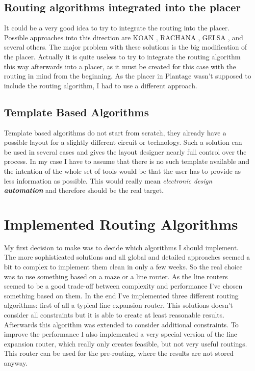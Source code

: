 \subsection{Routing algorithms integrated into the placer}
It could be a very good idea to try to integrate the routing into the placer. Possible approaches into this direction are KOAN \cite[page 178]{springer:eda_analog_routing}, RACHANA \cite[page 178]{springer:eda_analog_routing}, GELSA \cite[page 179]{springer:eda_analog_routing}, and several others. The major problem with these solutions is the big modification of the placer. Actually it is quite useless to try to integrate the routing algorithm this way afterwards into a placer, as it must be created for this case with the routing in mind from the beginning. As the placer in Plantage wasn't supposed to include the routing algorithm, I had to use a different approach.

\subsection{Template Based Algorithms}
Template based algorithms do not start from scratch, they already have a possible layout for a slightly different circuit or technology. Such a solution can be used in several cases and gives the layout designer nearly full control over the process. In my case I have to assume that there is no such template available and the intention of the whole set of tools would be that the user has to provide as less information as possible. This would really mean \textit{electronic design \textbf{automation}} and therefore should be the real target.

\section{Implemented Routing Algorithms}
My first decision to make was to decide which algorithms I should implement. The more sophisticated solutions and all global and detailed approaches seemed a bit to complex to implement them clean in only a few weeks. So the real choice was to use something based on a maze or a line router. As the line routers seemed to be a good trade-off between complexity and performance I've chosen something based on them. In the end I've implemented three different routing algorithms: first of all a typical line expansion router. This solutions doesn't consider all constraints but it is able to create at least reasonable results. Afterwards this algorithm was extended to consider additional constraints. To improve the performance I also implemented a very special version of the line expansion router, which really only creates feasible, but not very useful routings. This router can be used for the pre-routing, where the results are not stored anyway.

